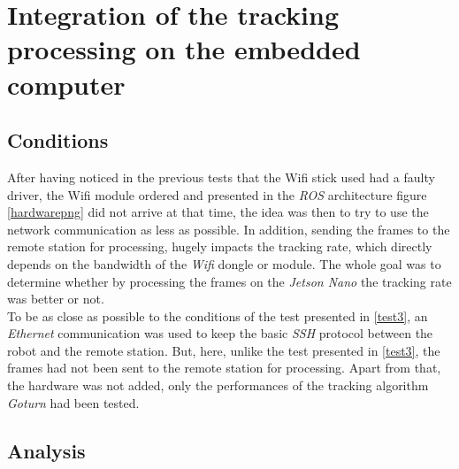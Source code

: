 		\FloatBarrier
		
		
	\section{Integration of the tracking processing on the embedded computer}\label{test4}
	
		\subsection{Conditions}
	
		After having noticed in the previous tests that the Wifi stick used had a faulty driver,
		the Wifi module ordered and presented in the \textit{ROS} architecture figure \vref{hardwarepng}
		did not arrive at that time, the idea was then to try to use the network communication
		as less as possible. In addition,
		sending the frames to the remote station
		for processing, hugely impacts the tracking rate, which directly depends on the 
		bandwidth of the \textit{Wifi} dongle or module. The whole goal was 
		to determine whether by processing the frames on the \textit{Jetson Nano} 
		the tracking rate was better or not.
		\\\indent To be as close as possible to the conditions of the 
		test presented in \vref{test3}, an \textit{Ethernet} communication 
		was used to keep the basic \textit{SSH} protocol between 
		the robot and the remote station. But, here, unlike the test presented in 
		\vref{test3}, the frames had not been sent to the remote station for processing.
		Apart from that, the hardware was not added, only the performances of
		the tracking algorithm \textit{Goturn} had been tested.
		
		\subsection{Analysis}
		
